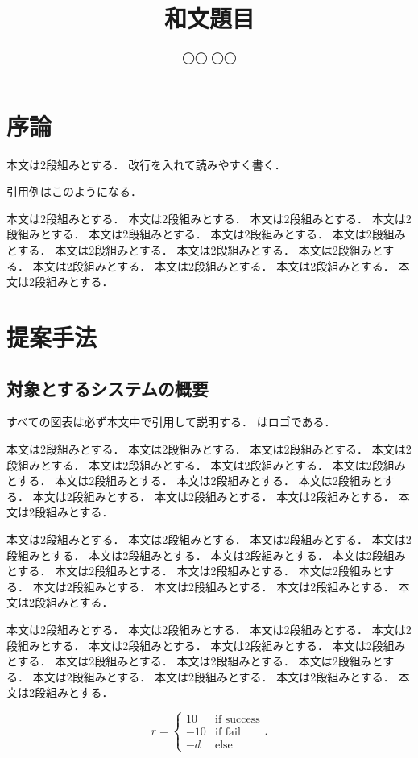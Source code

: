 \documentclass{/workdir/classes/summary}
\title{和文題目}
\author{◯◯ ◯◯}
\begin{document}
\maketitle

\section{序論}
本文は2段組みとする．
改行を入れて読みやすく書く．

引用例は\cite{Schlick1994}\cite{Chikushi2020}このようになる．

本文は2段組みとする．
本文は2段組みとする．
本文は2段組みとする．
本文は2段組みとする．
本文は2段組みとする．
本文は2段組みとする．
本文は2段組みとする．
本文は2段組みとする．
本文は2段組みとする．
本文は2段組みとする．
本文は2段組みとする．
本文は2段組みとする．
本文は2段組みとする．
本文は2段組みとする．

\section{提案手法}
\subsection{対象とするシステムの概要}
すべての図表は必ず本文中で引用して説明する．
はロゴである．

本文は2段組みとする．
本文は2段組みとする．
本文は2段組みとする．
本文は2段組みとする．
本文は2段組みとする．
本文は2段組みとする．
本文は2段組みとする．
本文は2段組みとする．
本文は2段組みとする．
本文は2段組みとする．
本文は2段組みとする．
本文は2段組みとする．
本文は2段組みとする．
本文は2段組みとする．

本文は2段組みとする．
本文は2段組みとする．
本文は2段組みとする．
本文は2段組みとする．
本文は2段組みとする．
本文は2段組みとする．
本文は2段組みとする．
本文は2段組みとする．
本文は2段組みとする．
本文は2段組みとする．
本文は2段組みとする．
本文は2段組みとする．
本文は2段組みとする．
本文は2段組みとする．

本文は2段組みとする．
本文は2段組みとする．
本文は2段組みとする．
本文は2段組みとする．
本文は2段組みとする．
本文は2段組みとする．
本文は2段組みとする．
本文は2段組みとする．
本文は2段組みとする．
本文は2段組みとする．
本文は2段組みとする．
本文は2段組みとする．
本文は2段組みとする．
本文は2段組みとする．

\begin{equation}
  r = \left\{
    \begin{array}{cc}
      10   & \text{if success} \\
      - 10 & \text{if fail}    \\
      - d  & \text{else}
    \end{array}
  \right. \text{.}
\end{equation}
\end{document}

